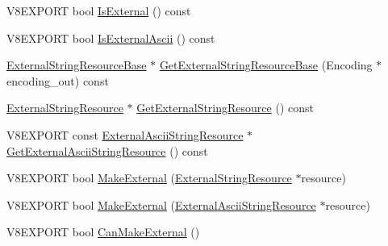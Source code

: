 \begin{DoxyCompactItemize}
\item 
V8\+E\+X\+P\+O\+R\+T bool \hyperlink{classv8_1_1_string_a945ba040efb2bffb14c04eda492767ac}{Is\+External} () const 
\item 
V8\+E\+X\+P\+O\+R\+T bool \hyperlink{classv8_1_1_string_a1b136ebc0ac30df9357e09b5486ca0a3}{Is\+External\+Ascii} () const 
\item 
\hyperlink{classv8_1_1_string_1_1_external_string_resource_base}{External\+String\+Resource\+Base} $\ast$ \hyperlink{classv8_1_1_string_a471cf0e3ca135d839e59d25da66894e0}{Get\+External\+String\+Resource\+Base} (Encoding $\ast$encoding\+\_\+out) const 
\item 
\hyperlink{classv8_1_1_string_1_1_external_string_resource}{External\+String\+Resource} $\ast$ \hyperlink{classv8_1_1_string_a1a78c6fe39dbdd6322ca576e224f0cba}{Get\+External\+String\+Resource} () const 
\item 
V8\+E\+X\+P\+O\+R\+T const \hyperlink{classv8_1_1_string_1_1_external_ascii_string_resource}{External\+Ascii\+String\+Resource} $\ast$ \hyperlink{classv8_1_1_string_a0156221ab1c700883897e9d3cf129017}{Get\+External\+Ascii\+String\+Resource} () const 
\item 
V8\+E\+X\+P\+O\+R\+T bool \hyperlink{classv8_1_1_string_a6419e6b87e73bf03e326dd862fdca495}{Make\+External} (\hyperlink{classv8_1_1_string_1_1_external_string_resource}{External\+String\+Resource} $\ast$resource)
\item 
V8\+E\+X\+P\+O\+R\+T bool \hyperlink{classv8_1_1_string_ad1970efe9119a63f667c4acbdccda424}{Make\+External} (\hyperlink{classv8_1_1_string_1_1_external_ascii_string_resource}{External\+Ascii\+String\+Resource} $\ast$resource)
\item 
V8\+E\+X\+P\+O\+R\+T bool \hyperlink{classv8_1_1_string_ac24779f37e73d8af36092cca294804c3}{Can\+Make\+External} ()
\end{DoxyCompactItemize}

